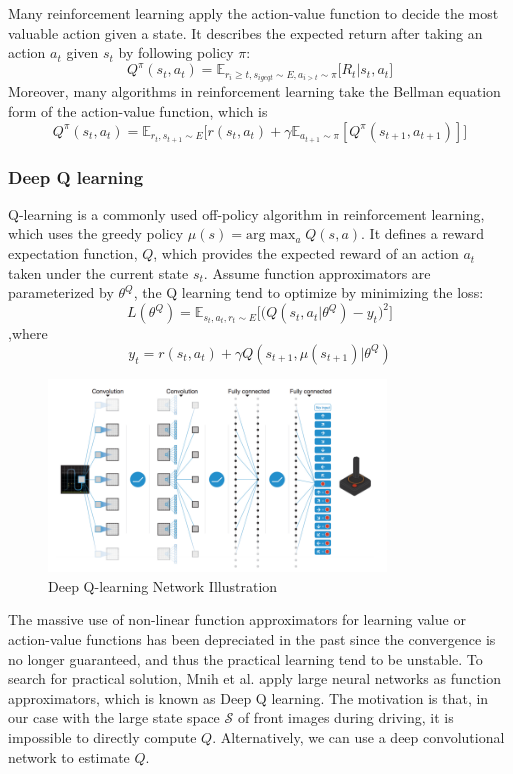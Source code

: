 \documentclass[a4paper]{article}
\begin{document}
Many reinforcement learning apply the action-value function to decide the most valuable action
given a state. It describes the expected return after taking an action $a_t$ given $s_t$ by
following policy $\pi$:
\[
    Q^{\pi}(s_t, a_t) = \mathbb{E}_{r_i \geq t, s_{i geq t} \sim E, a_{i > t} \sim \pi}
    {\big[ R_t | s_t, a_t \big]}
\]
Moreover, many algorithms in reinforcement learning take the Bellman equation form of the
action-value function, which is
\[
    Q^{\pi}(s_t, a_t) = \mathbb{E}_{r_t, s_{t+1} \sim E}
    {\big[ r(s_t, a_t) + \gamma \mathbb{E}_{a_{t+1} \sim \pi}{[Q^{\pi}(s_{t+1}, a_{t+1})]} \big]}
\]


\subsubsection{Deep Q learning}
Q-learning \cite{watkins1992q} is a commonly used off-policy algorithm in reinforcement learning,
which uses the greedy policy $\mu(s) = \text{arg} \max_a{Q(s,a)}$. It defines a reward
expectation function, $Q$, which provides the expected reward of an action $a_t$ taken under the
current state $s_t$. Assume function approximators are parameterized by $\theta^Q$, the Q learning
tend to optimize by minimizing the loss:
\[
    L(\theta^Q) = \mathbb{E}_{s_t, a_t, r_t \sim E}{\Bigg[ \big( Q(s_t, a_t | \theta^Q)
                                        - y_t\big)^2 \Bigg]} 
\]
,where
\[
    y_t = r(s_t, a_t) + \gamma Q(s_{t+1}, \mu(s_{t+1}) | \theta^Q)
\]

\begin{figure}
	\centering
	\includegraphics[width=0.8\textwidth]{./figures/deepq.png}
    \caption{ Deep Q-learning Network Illustration \cite{mnih2015human}}
	\label{fig:deepq}
\end{figure}

The massive use of non-linear function approximators for learning value or action-value functions has been depreciated in the past since the convergence is no longer guaranteed, and thus the practical learning tend to be unstable. To search for practical solution, Mnih et al. \cite{mnih2015human} apply large neural networks as function approximators, which is known as Deep Q learning. The motivation is that, in our case with the large state space $\mathcal{S}$ of front images during driving, it is impossible to directly compute $Q$. Alternatively, we can use a deep convolutional network to estimate $Q$.
\end{document}
